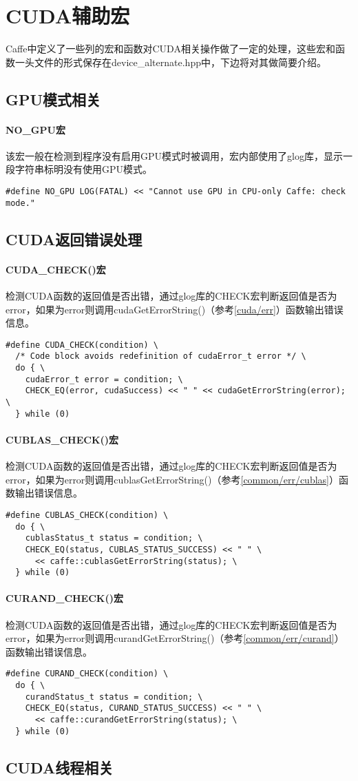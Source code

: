 \chapter{CUDA辅助宏}
Caffe中定义了一些列的宏和函数对CUDA相关操作做了一定的处理，这些宏和函数一头文件的形式保存在device\_alternate.hpp中，下边将对其做简要介绍。
\section{GPU模式相关}\label{cudamacro/gpumode}
\subsubsection{NO\_GPU宏}
该宏一般在检测到程序没有启用GPU模式时被调用，宏内部使用了glog库，显示一段字符串标明没有使用GPU模式。
\begin{verbatim}
#define NO_GPU LOG(FATAL) << "Cannot use GPU in CPU-only Caffe: check mode."
\end{verbatim}
\section{CUDA返回错误处理}\label{cudamacro/err}
\subsubsection{CUDA\_CHECK()宏}
检测CUDA函数的返回值是否出错，通过glog库的CHECK宏判断返回值是否为error，如果为error则调用cudaGetErrorString()（参考\ref{cuda/err}）函数输出错误信息。
\begin{verbatim}
#define CUDA_CHECK(condition) \
  /* Code block avoids redefinition of cudaError_t error */ \
  do { \
    cudaError_t error = condition; \
    CHECK_EQ(error, cudaSuccess) << " " << cudaGetErrorString(error); \
  } while (0)
\end{verbatim}
\subsubsection{CUBLAS\_CHECK()宏}
检测CUDA函数的返回值是否出错，通过glog库的CHECK宏判断返回值是否为error，如果为error则调用cublasGetErrorString()（参考\ref{common/err/cublas}）函数输出错误信息。
\begin{verbatim}
#define CUBLAS_CHECK(condition) \
  do { \
    cublasStatus_t status = condition; \
    CHECK_EQ(status, CUBLAS_STATUS_SUCCESS) << " " \
      << caffe::cublasGetErrorString(status); \
  } while (0)
\end{verbatim}
\subsubsection{CURAND\_CHECK()宏}
检测CUDA函数的返回值是否出错，通过glog库的CHECK宏判断返回值是否为error，如果为error则调用curandGetErrorString()（参考\ref{common/err/curand}）函数输出错误信息。
\begin{verbatim}
#define CURAND_CHECK(condition) \
  do { \
    curandStatus_t status = condition; \
    CHECK_EQ(status, CURAND_STATUS_SUCCESS) << " " \
      << caffe::curandGetErrorString(status); \
  } while (0)
\end{verbatim}

\section{CUDA线程相关}
